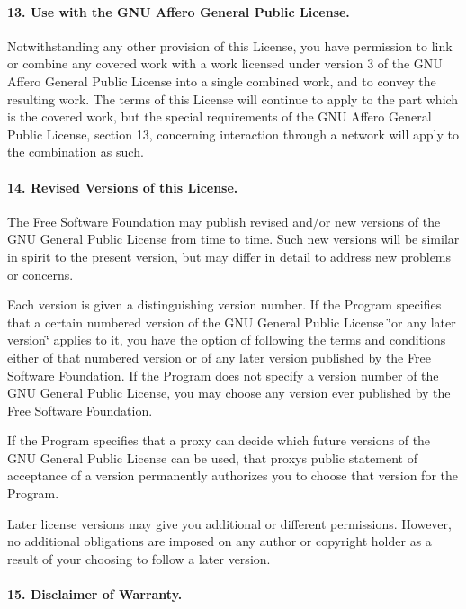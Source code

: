 \paragraph*{13. Use with the G\+NU Affero General Public License.}

Notwithstanding any other provision of this License, you have permission to link or combine any covered work with a work licensed under version 3 of the G\+NU Affero General Public License into a single combined work, and to convey the resulting work. The terms of this License will continue to apply to the part which is the covered work, but the special requirements of the G\+NU Affero General Public License, section 13, concerning interaction through a network will apply to the combination as such.

\paragraph*{14. Revised Versions of this License.}

The Free Software Foundation may publish revised and/or new versions of the G\+NU General Public License from time to time. Such new versions will be similar in spirit to the present version, but may differ in detail to address new problems or concerns.

Each version is given a distinguishing version number. If the Program specifies that a certain numbered version of the G\+NU General Public License \char`\"{}or any later version\char`\"{} applies to it, you have the option of following the terms and conditions either of that numbered version or of any later version published by the Free Software Foundation. If the Program does not specify a version number of the G\+NU General Public License, you may choose any version ever published by the Free Software Foundation.

If the Program specifies that a proxy can decide which future versions of the G\+NU General Public License can be used, that proxy\textquotesingle{}s public statement of acceptance of a version permanently authorizes you to choose that version for the Program.

Later license versions may give you additional or different permissions. However, no additional obligations are imposed on any author or copyright holder as a result of your choosing to follow a later version.

\paragraph*{15. Disclaimer of Warranty.}

